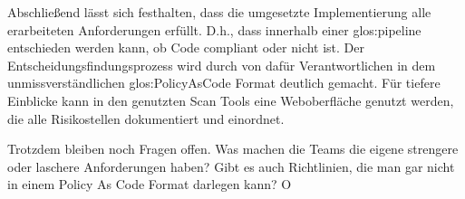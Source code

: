 \documentclass[../main.tex]{subfiles}
\begin{document}
Abschließend lässt sich festhalten, dass die umgesetzte Implementierung alle erarbeiteten Anforderungen erfüllt.
D.h., dass innerhalb einer \gls{glos:pipeline} entschieden werden kann, ob Code compliant oder nicht ist.
Der Entscheidungsfindungsprozess wird durch von dafür Verantwortlichen in dem unmissverständlichen \gls{glos:PolicyAsCode} Format deutlich gemacht.
Für tiefere Einblicke kann in den genutzten Scan Tools eine Weboberfläche genutzt werden, die alle Risikostellen dokumentiert und einordnet.

Trotzdem bleiben noch Fragen offen.
Was machen die Teams die eigene strengere oder laschere Anforderungen haben?
Gibt es auch Richtlinien, die man gar nicht in einem Policy As Code Format darlegen kann?
O
\end{document}
